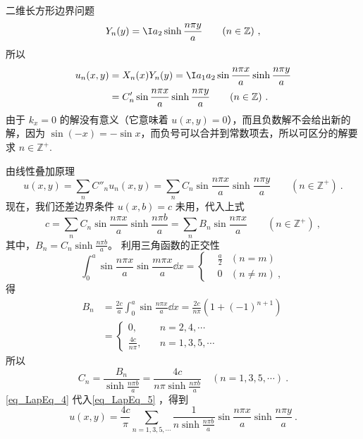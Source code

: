 \begin{example}{二维长方形边界问题}
\begin{equation}
Y_n(y)=\I a_2\sinh\frac{n\pi y}{a}\qquad (n\in \mathbb{Z})~,
\end{equation}
所以
\begin{equation}
\begin{aligned}
u_n(x,y)&=X_n(x)Y_n(y)=\I a_1a_2\sin\frac{n\pi x}{a}\sinh\frac{n\pi y}{a}\\
&=C'_n\sin\frac{n\pi x}{a}\sinh\frac{n\pi y}{a} \qquad (n\in\mathbb{Z})~.
\end{aligned}
\end{equation}
由于 $k_x=0$ 的解没有意义（它意味着 $u(x,y)=0$），而且负数解不会给出新的解，因为 $\sin(-x)=-\sin x$，而负号可以合并到常数项去，所以可区分的解要求 $n\in\mathbb{Z^+}$.

由线性叠加原理
\begin{equation}\label{eq_LapEq_5}
u(x,y)=\sum_n C''_n u_n(x,y)=\sum_n C_n\sin\frac{n\pi x}{a}\sinh\frac{n\pi y}{a} \qquad  (n\in\mathbb{Z^+})~.
\end{equation}
现在，我们还差边界条件 $u(x,b)=c$ 未用，代入上式
\begin{equation}
c=\sum_n C_n\sin\frac{n\pi x}{a}\sinh\frac{n\pi b}{a}=\sum_n B_n\sin\frac{n\pi x}{a} \qquad (n\in\mathbb{Z^+})~,
\end{equation}
其中，$B_n=C_n\sinh \frac{n\pi b}{a}$。
利用三角函数的正交性
\begin{equation}
\int_0^a\sin\frac{n\pi x}{a}\sin\frac{m\pi x}{a}\dd x=\left\{\begin{aligned}
&\frac{a}{2}&(n=m)\\
& 0     &(n\neq m)~,
\end{aligned}\right.
\end{equation}
得
\begin{equation}
\begin{aligned}
B_n&=\frac{2c}{a}\int_0^a\sin\frac{n\pi x}{a}\dd x=\frac{2c}{n\pi}(1+(-1)^{n+1})\\
&=\left\{\begin{aligned}
0,&\quad n=2,4,\cdots~\\
\frac{4c}{n\pi},&\quad n=1,3,5,\cdots~
\end{aligned}\right.
\end{aligned}~
\end{equation}
所以
\begin{equation}\label{eq_LapEq_4}
C_n=\frac{B_n}{\sinh \frac{n\pi b}{a}}=\frac{4c}{n\pi\sinh \frac{n\pi b}{a}}\quad
(n=1,3,5,\cdots)~.
\end{equation}
\autoref{eq_LapEq_4} 代入\autoref{eq_LapEq_5} ，得到
\begin{equation}
u(x,y)=\frac{4c}{\pi}\sum_{n=1,3,5,\cdots} \frac{1}{n\sinh \frac{n\pi b}{a}}\sin\frac{n\pi x}{a}\sinh\frac{n\pi y}{a}~.
\end{equation}
\end{example}
